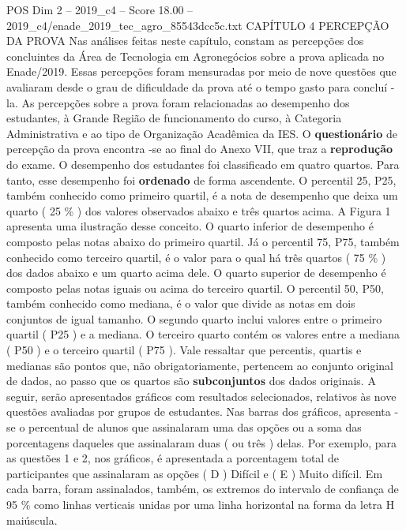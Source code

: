 \begin{textsample}{POS Dim 2 – 2019\_c4 – Score 18.00 – 2019\_c4/enade\_2019\_tec\_agro\_85543dcc5c.txt}  \label{ex:f2_pos_042}
CAPÍTULO 4 PERCEPÇÃO DA PROVA Nas análises feitas neste capítulo, constam as percepções dos concluintes da Área de Tecnologia em Agronegócios sobre a prova aplicada no Enade/2019.
Essas percepções foram mensuradas por meio de nove questões que avaliaram desde o grau de dificuldade da prova até o tempo gasto para concluí -la.
As percepções sobre a prova foram relacionadas ao desempenho dos estudantes, à Grande Região de funcionamento do curso, à Categoria Administrativa e ao tipo de Organização Acadêmica da IES.
O \textbf{questionário} de percepção da prova encontra -se ao final do Anexo VII, que traz a \textbf{reprodução} do exame.
O desempenho dos estudantes foi classificado em quatro quartos.
Para tanto, esse desempenho foi \textbf{ordenado} de forma ascendente.
O percentil 25, P25, também conhecido como primeiro quartil, é a nota de desempenho que deixa um quarto ( 25 \% ) dos valores observados abaixo e três quartos acima.
A Figura 1 apresenta uma ilustração desse conceito.
O quarto inferior de desempenho é composto pelas notas abaixo do primeiro quartil.
Já o percentil 75, P75, também conhecido como terceiro quartil, é o valor para o qual há três quartos ( 75 \% ) dos dados abaixo e um quarto acima dele.
O quarto superior de desempenho é composto pelas notas iguais ou acima do terceiro quartil.
O percentil 50, P50, também conhecido como mediana, é o valor que divide as notas em dois conjuntos de igual tamanho.
O segundo quarto inclui valores entre o primeiro quartil ( P25 ) e a mediana.
O terceiro quarto contém os valores entre a mediana ( P50 ) e o terceiro quartil ( P75 ).
Vale ressaltar que percentis, quartis e medianas são pontos que, não obrigatoriamente, pertencem ao conjunto original de dados, ao passo que os quartos são \textbf{subconjuntos} dos dados originais.
A seguir, serão apresentados gráficos com resultados selecionados, relativos às nove questões avaliadas por grupos de estudantes.
Nas barras dos gráficos, apresenta -se o percentual de alunos que assinalaram uma das opções ou a soma das porcentagens daqueles que assinalaram duas ( ou três ) delas.
Por exemplo, para as questões 1 e 2, nos gráficos, é apresentada a porcentagem total de participantes que assinalaram as opções ( D ) Difícil e ( E ) Muito difícil.
Em cada barra, foram assinalados, também, os extremos do intervalo de confiança de 95 \% como linhas verticais unidas por uma linha horizontal na forma da letra H maiúscula.

\end{textsample}
